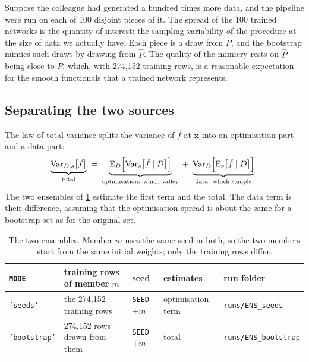 \documentclass[11pt]{article}
\newcommand{\file}[1]{\nolinkurl{#1}}
\newcommand{\code}[1]{\texttt{#1}}
\newcommand{\bx}{\boldsymbol{x}}
\begin{document}
\begin{aside}
Suppose the colleague had generated a hundred times more data, and the pipeline were run
on each of 100 disjoint pieces of it. The spread of the 100 trained networks is the
quantity of interest: the sampling variability of the procedure at the size of data we
actually have. Each piece is a draw from $P$, and the bootstrap mimics such draws by
drawing from $\hat P$. The quality of the mimicry rests on $\hat P$ being close to $P$,
which, with 274,152 training rows, is a reasonable expectation for the smooth functionals
that a trained network represents.
\end{aside}

\subsection{Separating the two sources}
\label{sec:decomp}

The law of total variance splits the variance of $\hat f$ at $\bx$ into an optimisation
part and a data part:
\begin{equation}
  \underbrace{\operatorname{Var}_{D,s}\bigl[\hat f\bigr]}_{\text{total}}
  \;=\;
  \underbrace{\operatorname{E}_{D}\Bigl[\operatorname{Var}_{s}\bigl[\hat f \mid D\bigr]\Bigr]}_{\text{optimisation: which valley}}
  \;+\;
  \underbrace{\operatorname{Var}_{D}\Bigl[\operatorname{E}_{s}\bigl[\hat f \mid D\bigr]\Bigr]}_{\text{data: which sample}} .
  \label{eq:totvar}
\end{equation}
The two ensembles of \cref{tab:ensembles} estimate the first term and the total. The data
term is their difference, assuming that the optimisation spread is about the same for a
bootstrap set as for the original set.

\begin{table}[h]
\centering\small
\begin{tabular}{lllll}
\toprule
\code{MODE} & training rows of member $m$ & seed & estimates & run folder\\
\midrule
\code{'seeds'} & the 274,152 training rows & \code{SEED} $+ m$ & optimisation term & \file{runs/ENS_seeds}\\
\code{'bootstrap'} & 274,152 rows drawn from them & \code{SEED} $+ m$ & total & \file{runs/ENS_bootstrap}\\
\bottomrule
\end{tabular}
\caption{The two ensembles. Member $m$ uses the same seed in both, so the two members
start from the same initial weights; only the training rows differ.}
\label{tab:ensembles}
\end{table}
\end{document}
